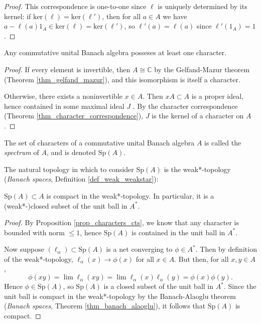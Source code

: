 \documentclass[12pt]{article}
\begin{document}
\begin{proof}
	This correspondence is one-to-one since $\ell$ is uniquely determined by its kernel: if $\text{ker}(\ell) = \text{ker}(\ell')$, then for all $a\in A$ we have $a-\ell(a)1_A\in\text{ker}(\ell)=\text{ker}(\ell')$, so $\ell'(a)=\ell(a)$ since $\ell'(1_A)=1$.
\end{proof}

\begin{proposition} %
	Any commutative unital Banach algebra posseses at least one character.
\end{proposition}
\begin{proof}
	If every element is invertible, then $A\cong\mathbb{C}$ by the Gelfand-Mazur theorem (Theorem \ref{thm_gelfand_mazur}), and this isomorphism is itself a character.

	Otherwise, there exists a noninvertible $x\in A$. Then $xA\subset A$ is a proper ideal, hence contained in some maximal ideal $J$ . By the character correspondence (Theorem \ref{thm_character_correspondence}), $J$ is the kernel of a character on $A$.
\end{proof}

\begin{definition}
	The set of characters of a commutative unital Banach algebra $A$ is called the \emph{spectrum} of $A$, and is denoted $\text{Sp}(A)$.
\end{definition}

The natural topology in which to consider $\text{Sp}(A)$ is the weak*-topology (\textit{Banach spaces}, Definition \ref{def_weak_weakstar}):

\begin{proposition} %
\label{prop_spa_compact}
	$\text{Sp}(A)\subset A$ is compact in the weak*-topology. In particular, it is a (weak*-)closed subset of the unit ball in $A^\ast$.
\end{proposition}
\begin{proof}
	By Proposition \ref{prop_characters_cts}, we know that any character is bounded with norm $\leq 1$, hence $\text{Sp}(A)$ is contained in the unit ball in $A^\ast$. 

	Now suppose $(\ell_\alpha)\subset\text{Sp}(A)$ is a net converging to $\phi\in A^\ast$. Then by definition of the weak*-topology, $\ell_\alpha(x)\to\phi(x)$ for all $x\in A$. But then, for all $x,y\in A$,
	\begin{equation*}
		\phi(xy) = \lim\ell_\alpha(xy) = \lim\ell_\alpha(x)\ell_\alpha(y) = \phi(x)\phi(y).
	\end{equation*}
	Hence $\phi\in\text{Sp}(A)$, so $\text{Sp}(A)$ is a closed subset of the unit ball in $A^\ast$. Since the unit ball is compact in the weak*-topology by the Banach-Alaoglu theorem (\textit{Banach spaces}, Theorem \ref{thm_banach_alaoglu}), it follows that $\text{Sp}(A)$ is compact.
\end{proof}
\end{document}
